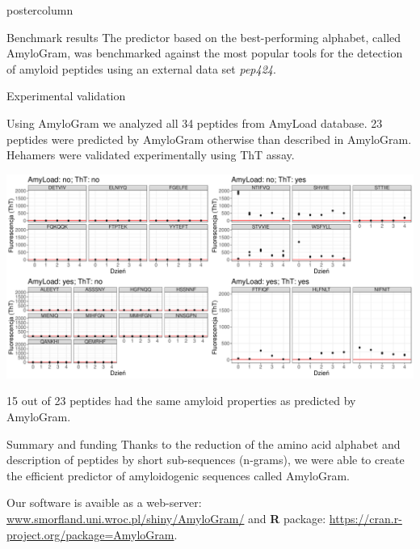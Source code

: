 \documentclass[final]{beamer}\usepackage[]{graphicx}\usepackage[]{color}
\makeatletter
\def\maxwidth{ %
  \ifdim\Gin@nat@width>\linewidth
    \linewidth
  \else
    \Gin@nat@width
  \fi
}
\newenvironment{knitrout}{}{} %
\makeatother
\begin{document}
\begin{frame}
\begin{columns}
\begin{column}{.48\textwidth}
\begin{beamercolorbox}[center,wd=\textwidth]{postercolumn}
\begin{minipage}[T]{.95\textwidth}
{\begin{block}{Benchmark results}
The predictor based on the best-performing alphabet, called AmyloGram, was benchmarked against the most popular tools for the detection of amyloid peptides using an external data set \textit{pep424}.

\end{block}
\vfill


\begin{block}{Experimental validation}

Using AmyloGram we analyzed all 34 peptides from AmyLoad database. 23 peptides were predicted by AmyloGram otherwise than described in AmyloGram. Hehamers were validated experimentally using ThT assay.

\begin{knitrout}
\color{fgcolor}

{\centering \includegraphics[width=\maxwidth]{figure/unnamed-chunk-3-1} 

}



\end{knitrout}

15 out of 23 peptides had the same amyloid properties as predicted by AmyloGram.

\end{block}
\vfill


\begin{block}{Summary and funding}
Thanks to the reduction of the amino acid alphabet and description of peptides by 
short sub-sequences (n-grams), we were able to create the efficient predictor 
of amyloidogenic sequences called AmyloGram.

\bigskip

Our software is avaible as a web-server: \url{www.smorfland.uni.wroc.pl/shiny/AmyloGram/} and \textbf{R} package: \url{https://cran.r-project.org/package=AmyloGram}.


\end{block}}
\end{minipage}
\end{beamercolorbox}
\end{column}
\end{columns}
\end{frame}
\end{document}
